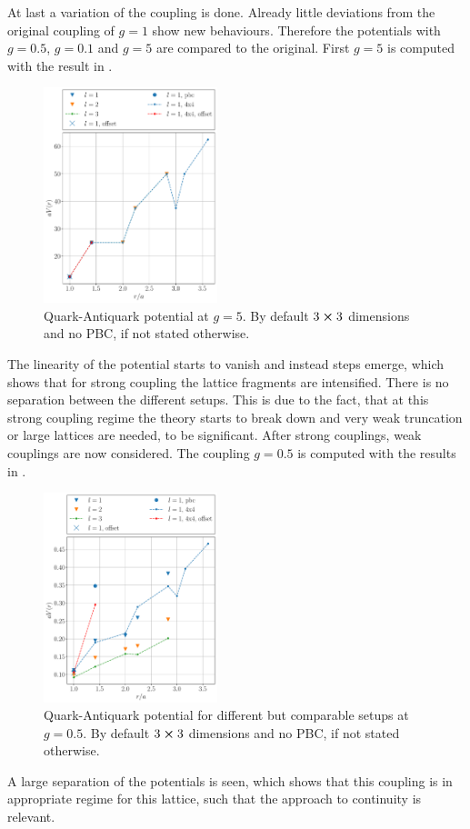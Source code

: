 At last a variation of the coupling is done. Already little deviations from the original coupling of $g=1$ show new behaviours. Therefore the potentials with $g=0.5$, $g=0.1$ and $g=5$ are compared to the original.
First $g=5$ is computed with the result in .
\begin{figure}[h]
	\begin{center}
		\includegraphics[width=0.45\textwidth]{images/quark_antiquark_potential_g_5.pdf}
	\end{center}
	\caption{Quark-Antiquark potential at $g=\num{5}$. By default $3\cross3$ dimensions and no PBC, if not stated otherwise.}\label{fig:qqbarl}
\end{figure}
The linearity of the potential starts to vanish and instead steps emerge, which shows that for strong coupling the lattice fragments are intensified.
There is no separation between the different setups. This is due to the fact, that at this strong coupling regime the theory starts to break down and very weak truncation or large lattices are needed, to be significant.%
After strong couplings, weak couplings are now considered. The coupling $g=0.5$ is computed with the results in .
\begin{figure}[h]
	\begin{center}
		\includegraphics[width=0.45\textwidth]{images/quark_antiquark_potential_g_0.5.pdf}
	\end{center}
	\caption{Quark-Antiquark potential for different but comparable setups at $g=\num{0.5}$. By default $3\cross3$ dimensions and no PBC, if not stated otherwise.}\label{fig:qqbars5}
\end{figure}
A large separation of the potentials is seen, which shows that this coupling is in appropriate regime for this lattice, such that the approach to continuity is relevant.

